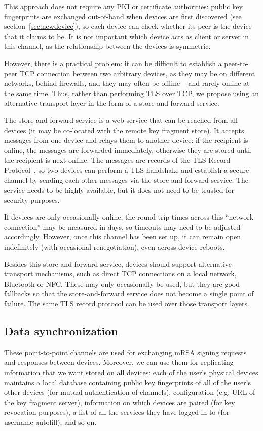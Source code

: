 This approach does not require any PKI or certificate authorities: public key fingerprints are
exchanged out-of-band when devices are first discovered (see section~\ref{sec:newdevice}), so each
device can check whether its peer is the device that it claims to be. It is not important which
device acts as client or server in this channel, as the relationship between the devices is
symmetric.

However, there is a practical problem: it can be difficult to establish a peer-to-peer TCP
connection between two arbitrary devices, as they may be on different networks, behind firewalls,
and they may often be offline -- and rarely online at the same time. Thus, rather than performing
TLS over TCP, we propose using an alternative transport layer in the form of a store-and-forward
service.

The store-and-forward service is a web service that can be reached from all devices (it may be
co-located with the remote key fragment store). It accepts messages from one device and relays them
to another device: if the recipient is online, the messages are forwarded immediately, otherwise
they are stored until the recipient is next online. The messages are records of the TLS Record
Protocol~\cite{TLS}, so two devices can perform a TLS handshake and establish a secure channel by
sending each other messages via the store-and-forward service. The service needs to be highly
available, but it does not need to be trusted for security purposes.

If devices are only occasionally online, the round-trip-times across this ``network connection'' may
be measured in days, so timeouts may need to be adjusted accordingly. However, once this channel has
been set up, it can remain open indefinitely (with occasional renegotiation), even across device
reboots.

Besides this store-and-forward service, devices should support alternative transport mechanisms,
such as direct TCP connections on a local network, Bluetooth or NFC. These may only occasionally be
used, but they are good fallbacks so that the store-and-forward service does not become a single
point of failure. The same TLS record protocol can be used over those transport layers.

\subsection{Data synchronization}\label{sec:devicesync}

These point-to-point channels are used for exchanging mRSA signing requests and responses between
devices. Moreover, we can use them for replicating information that we want stored on all devices:
each of the user's physical devices maintains a local database containing public key fingerprints of
all of the user's other devices (for mutual authentication of channels), configuration (e.g. URL of
the key fragment server), information on which devices are paired (for key revocation purposes), a
list of all the services they have logged in to (for username autofill), and so on.

